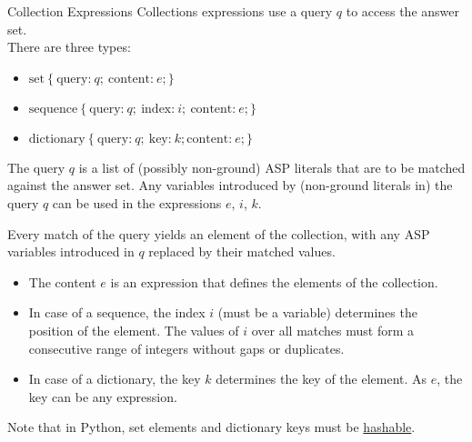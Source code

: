 \documentclass[%
beamer,%
english,%
10pt,%
]{beamer}
\newcommand{\blue}[1]{{\color{blue}#1}}
\begin{document}
\begin{frame}{Collection Expressions}
    Collections expressions use a query $q$ to access the answer set. \\
    There are three types:
    \begin{itemize}
        \item \blue{$\text{set}~\{~\text{query:}~q;~\text{content:}~e;\}$}
        \item \blue{$\text{sequence}~\{~\text{query:}~q;~\text{index:}~i;~\text{content:}~e;\}$}
        \item \blue{$\text{dictionary}~\{~\text{query:}~q;~\text{key:}~k;\text{content:}~e;\}$}
    \end{itemize}

    \medskip
    The query $q$ is a list of (possibly non-ground) ASP literals that are to be matched against the answer set.
    Any variables introduced by (non-ground literals in) the query $q$ can be used in the expressions $e$, $i$, $k$.

    Every match of the query yields an element of the collection, with any ASP variables introduced in $q$ replaced by their matched values.
    \begin{itemize}
        \item The \blue{content} $e$ is an expression that defines the elements of the collection.
        \item In case of a sequence, the \blue{index} $i$ (must be a variable) determines the position of the element.
            The values of $i$ over all matches must form a consecutive range of integers without gaps or duplicates.
        \item In case of a dictionary, the \blue{key} $k$ determines the key of the element.
            As $e$, the key can be any expression.
    \end{itemize}

    Note that in Python, set elements and dictionary keys must be \href{https://docs.python.org/3/reference/datamodel.html#object.__hash__}{hashable}.

    \framebreak


\end{frame}
\end{document}
